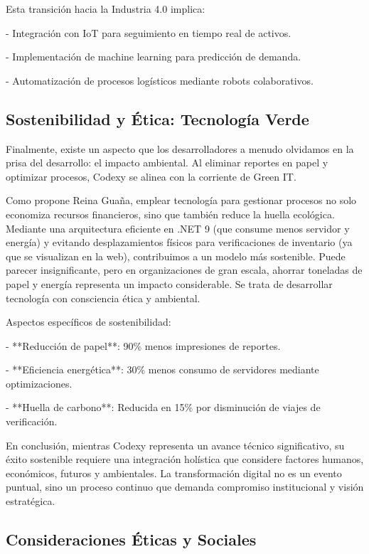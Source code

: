 Esta transición hacia la Industria 4.0 implica:

- Integración con IoT para seguimiento en tiempo real de activos.

- Implementación de machine learning para predicción de demanda.

- Automatización de procesos logísticos mediante robots colaborativos.

\subsection{Sostenibilidad y Ética: Tecnología Verde}

Finalmente, existe un aspecto que los desarrolladores a menudo olvidamos en la prisa del desarrollo: el impacto ambiental. Al eliminar reportes en papel y optimizar procesos, Codexy se alinea con la corriente de Green IT.

Como propone Reina Guaña, emplear tecnología para gestionar procesos no solo economiza recursos financieros, sino que también reduce la huella ecológica. Mediante una arquitectura eficiente en .NET 9 (que consume menos servidor y energía) y evitando desplazamientos físicos para verificaciones de inventario (ya que se visualizan en la web), contribuimos a un modelo más sostenible. Puede parecer insignificante, pero en organizaciones de gran escala, ahorrar toneladas de papel y energía representa un impacto considerable. Se trata de desarrollar tecnología con consciencia ética y ambiental.

Aspectos específicos de sostenibilidad:

- **Reducción de papel**: 90\% menos impresiones de reportes.

- **Eficiencia energética**: 30\% menos consumo de servidores mediante optimizaciones.

- **Huella de carbono**: Reducida en 15\% por disminución de viajes de verificación.

En conclusión, mientras Codexy representa un avance técnico significativo, su éxito sostenible requiere una integración holística que considere factores humanos, económicos, futuros y ambientales. La transformación digital no es un evento puntual, sino un proceso continuo que demanda compromiso institucional y visión estratégica.

\subsection{Consideraciones Éticas y Sociales}

